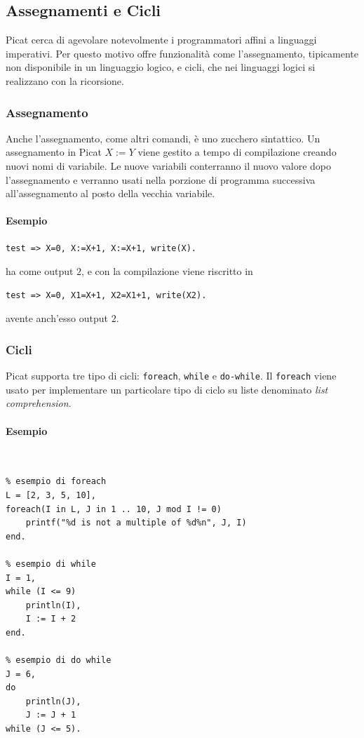 \documentclass[12pt,a4paper,openright]{book} %
\begin{document}
\subsection{Assegnamenti e Cicli}
\label{sec:picat_base_asscycle}

Picat cerca di agevolare notevolmente i programmatori affini a linguaggi imperativi. Per questo motivo offre funzionalità come l'assegnamento, tipicamente non disponibile in un linguaggio logico,
e cicli, che nei linguaggi logici si realizzano con la ricorsione.

\subsubsection{Assegnamento}

Anche l'assegnamento, come altri comandi, è uno zucchero sintattico. Un assegnamento in Picat $X := Y$ viene gestito a tempo di compilazione creando nuovi nomi di variabile. Le nuove variabili conterranno il nuovo valore dopo l'assegnamento e verranno usati nella porzione di programma successiva all'assegnamento al posto della vecchia variabile.

\paragraph{Esempio}
\begin{verbatim}
test => X=0, X:=X+1, X:=X+1, write(X).
\end{verbatim}
ha come output $2$, e con la compilazione viene riscritto in
\begin{verbatim}
test => X=0, X1=X+1, X2=X1+1, write(X2).
\end{verbatim}
avente anch'esso output $2$.

\subsubsection{Cicli}

Picat supporta tre tipo di cicli: \verb|foreach|, \verb|while| e \verb|do-while|. Il \verb|foreach| viene usato per implementare un particolare tipo di ciclo su liste denominato \emph{list comprehension}.

\paragraph{Esempio}\
\begin{lstlisting}
% esempio di foreach
L = [2, 3, 5, 10],
foreach(I in L, J in 1 .. 10, J mod I != 0)
	printf("%d is not a multiple of %d%n", J, I)
end.

% esempio di while
I = 1,
while (I <= 9)
	println(I),
	I := I + 2
end.

% esempio di do while
J = 6,
do
	println(J),
	J := J + 1
while (J <= 5).
\end{lstlisting}
\end{document}
